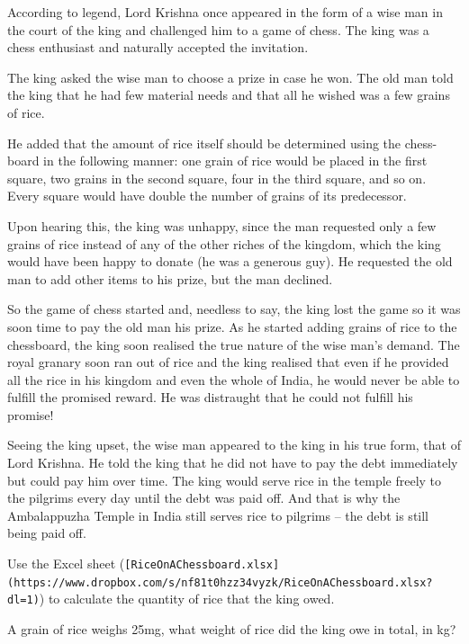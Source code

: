 \documentclass[
  a4paper]{book}
\begin{document}
According to legend, Lord Krishna once appeared in the form of a wise man in the court of the king and challenged him to a game of chess. The king was a chess enthusiast and naturally accepted the invitation.

The king asked the wise man to choose a prize in case he won. The old man told the king that he had few material needs and that all he wished was a few grains of rice.

He added that the amount of rice itself should be determined using the chess- board in the following manner: one grain of rice would be placed in the first square, two grains in the second square, four in the third square, and so on. Every square would have double the number of grains of its predecessor.

Upon hearing this, the king was unhappy, since the man requested only a few grains of rice instead of any of the other riches of the kingdom, which the king would have been happy to donate (he was a generous guy). He requested the old man to add other items to his prize, but the man declined.

So the game of chess started and, needless to say, the king lost the game so it was soon time to pay the old man his prize. As he started adding grains of rice to the chessboard, the king soon realised the true nature of the wise man's demand. The royal granary soon ran out of rice and the king realised that even if he provided all the rice in his kingdom and even the whole of India, he would never be able to fulfill the promised reward. He was distraught that he could not fulfill his promise!

Seeing the king upset, the wise man appeared to the king in his true form, that of Lord Krishna. He told the king that he did not have to pay the debt immediately but could pay him over time. The king would serve rice in the temple freely to the pilgrims every day until the debt was paid off. And that is why the Ambalappuzha Temple in India still serves rice to pilgrims -- the debt is still being paid off.

\begin{do-something}
Use the Excel sheet
(\texttt{{[}RiceOnAChessboard.xlsx{]}(https://www.dropbox.com/s/nf81t0hzz34vyzk/RiceOnAChessboard.xlsx?dl=1)})
to calculate the quantity of rice that the king owed.

A grain of rice weighs 25mg, what weight of rice did the king owe in
total, in kg?
\end{do-something}
\end{document}
